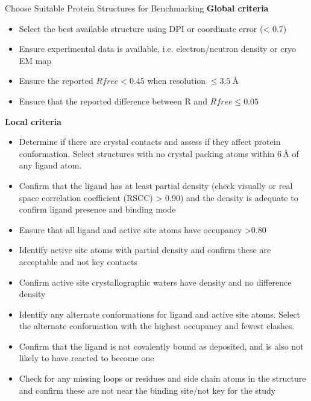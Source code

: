 \documentclass[9pt,bestpractices,pubversion]{livecoms}
\begin{document}
\begin{Checklists*}[!hp]
\begin{checklist}{Choose Suitable Protein Structures for Benchmarking}
    \textbf{Global criteria}
    \begin{itemize}
        \item Select the best available structure using DPI or coordinate error (< 0.7)
        \item Ensure experimental data is available, i.e. electron/neutron density or cryo EM map
        \item Ensure the reported $Rfree < 0.45$ when resolution $\le 3.5~$\AA{}
        \item Ensure that the reported difference between R and $Rfree \le 0.05$
        \end{itemize}
    \textbf{Local criteria}
    \begin{itemize}
        \item Determine if there are crystal contacts and assess if they affect protein conformation. Select structures with no crystal packing atoms within $6\,$\AA{} of any ligand atom.
        \item Confirm that the ligand has at least partial density (check visually or real space correlation coefficient (RSCC) > 0.90) and the density is adequate to confirm ligand presence and binding mode
        \item Ensure that all ligand and active site atoms have occupancy >0.80
        \item Identify active site atoms with partial density and confirm these are acceptable and not key contacts
        \item Confirm active site crystallographic waters have density and no difference density
        \item Identify any alternate conformations for ligand and active site atoms. Select the alternate conformation with the highest occupancy and fewest clashes. 
        \item Confirm that the ligand is not covalently bound as deposited, and is also not likely to have reacted to become one
        \item Check for any missing loops or residues and side chain atoms in the structure and confirm these are not near the binding site/not key for the study
    \end{itemize}

\end{checklist}
\end{Checklists*}
\end{document}
